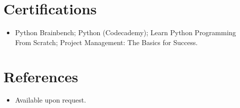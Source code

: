 \documentclass[11pt,a4paper,sans]{moderncv}
\begin{document}

\section{Certifications}
\vspace{1pt}
\begin{itemize}
\item Python Brainbench; Python (Codecademy); Learn Python Programming From Scratch; Project Management: The Basics for Success.
\end{itemize}


\section{References}
\vspace{1pt}
\begin{itemize}
\item{Available upon request.}
\end{itemize}
\end{document}

